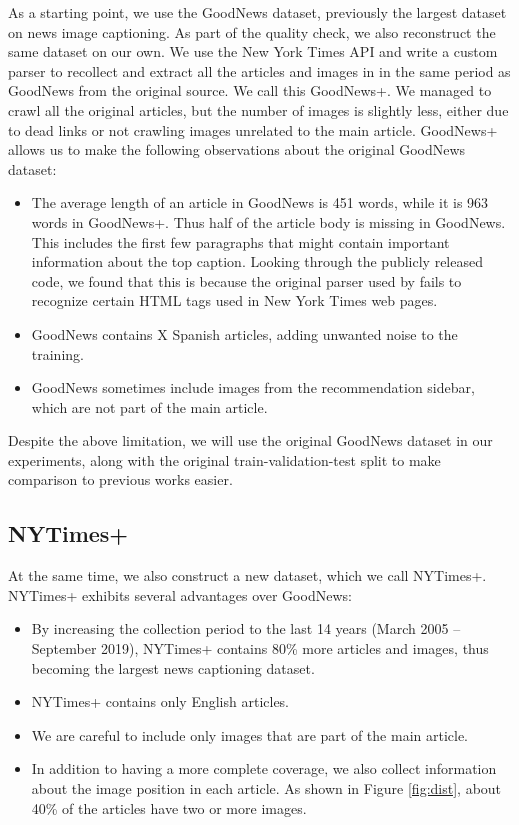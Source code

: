 \documentclass[10pt,twocolumn,letterpaper]{article}
\begin{document}
As a starting point, we use the GoodNews dataset, previously the largest
dataset on news image captioning. As part of the quality check, we also
reconstruct the same dataset on our own. We use the New York Times API and
write a custom parser to recollect and extract all the articles and images in
in the same period as GoodNews from the original source. We call this
GoodNews+. We managed to crawl all the original articles, but the number of
images is slightly less, either due to dead links or not crawling images
unrelated to the main article. GoodNews+ allows us to make the following
observations about the original GoodNews dataset:

\begin{itemize}
   \item The average length of an article in GoodNews is 451 words, while it is
         963 words in GoodNews+. Thus half of the article body is missing in
         GoodNews. This includes the first few paragraphs that might contain
         important information about the top caption. Looking through the
         publicly released code, we found that this is because the original
         parser used by \cite{Biten2019GoodNews} fails to recognize certain
         HTML tags used in New York Times web pages.
   \item GoodNews contains X Spanish articles, adding unwanted noise to the
         training.
   \item GoodNews sometimes include images from the recommendation sidebar,
         which are not part of the main article.
\end{itemize}

Despite the above limitation, we will use the original GoodNews dataset in our
experiments, along with the original train-validation-test split to make
comparison to previous works easier.

\subsection{NYTimes+}

At the same time, we also construct a new dataset, which we call NYTimes+.
NYTimes+ exhibits several advantages over GoodNews:

\begin{itemize}
   \item By increasing the collection period to the last 14 years (March 2005
   -- September 2019), NYTimes+ contains 80\% more articles and images, thus
   becoming the largest news captioning dataset.
   \item NYTimes+ contains only English articles.
   \item We are careful to include only images that are part of the main
   article.
   \item In addition to having a more complete coverage, we also collect
   information about the image position in each article. As shown in Figure
   \ref{fig:dist}, about 40\% of the articles have two or more images.
\end{itemize}
\end{document}
